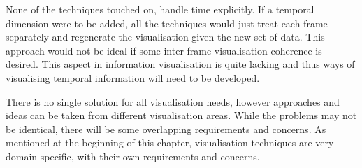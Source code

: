 None of the techniques touched on, handle time explicitly. If a temporal
dimension were to be added, all the techniques would just treat each frame
separately and regenerate the visualisation given the new set of data.  This
approach would not be ideal if some inter-frame visualisation coherence is
desired. This aspect in information visualisation is quite lacking and thus
ways of visualising temporal information will need to be developed.

There is no single solution for all visualisation needs, however approaches and
ideas can be taken from different visualisation areas. While the problems may
not be identical, there will be some overlapping requirements and concerns. As
mentioned at the beginning of this chapter, visualisation techniques are very
domain specific, with their own requirements and concerns.



